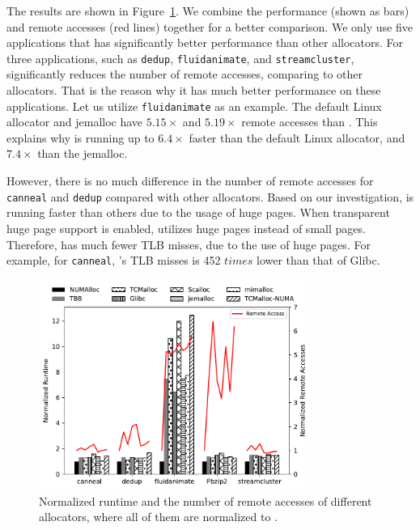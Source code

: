 The results are shown in Figure~\ref{fig:remoteAccess}. We combine the performance (shown as bars) and remote accesses (red lines) together for a better comparison. We only use five applications that \NM{} has significantly better performance than other allocators.  For three applications, such as \texttt{dedup}, \texttt{fluidanimate}, and \texttt{streamcluster}, \NM{}  significantly reduces the number of remote accesses, comparing to other allocators. That is the reason why it has much better performance on these applications. Let us utilize \texttt{fluidanimate} as an example. The default Linux allocator and jemalloc 
have $5.15\times$ and $5.19\times$ remote accesses than \NM{}. This explains why \NM{} is running up to $6.4\times$ faster than the default Linux allocator, and $7.4\times$ than the jemalloc. 

However, there is no much difference in the number of remote accesses for \texttt{canneal} and \texttt{dedup} compared with other allocators. Based on our investigation, \NM{} is running faster than others due to the usage of huge pages. When transparent huge page support is enabled, \NM{} utilizes huge pages instead of small pages. Therefore, \NM{} has much fewer TLB misses, due to the use of huge pages. For example, for \texttt{canneal}, \NM{}'s TLB misses is 452 $times$ lower than that of Glibc.




\begin{figure}[!h]
    \centering
    \includegraphics[width=3.5in]{figure/remote-access2.pdf}
    \caption{Normalized runtime and the number of remote accesses of different allocators, where all of them are normalized to \NM{}. }
    \label{fig:remoteAccess}
\end{figure}

